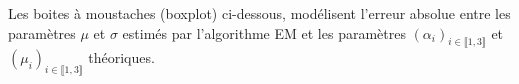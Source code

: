 \documentclass[frenchb]{report}
\newcommand{\1}{\mathbbm{1}}
\theoremstyle{definition}\newtheorem{defn}{Définition}
\theoremstyle{definition}\newtheorem{exm}{Exemple}
\theoremstyle{definition}\newtheorem{nota}{Notation}
\theoremstyle{definition}\newtheorem{rem}{Remarque}
\begin{document}
Les boites à moustaches (boxplot) ci-dessous, modélisent l'erreur absolue entre les paramètres $\mu$ et $\sigma$ estimés par l'algorithme EM et les paramètres $(\alpha_i)_{i\in\llbracket1,3\rrbracket}$ et $(\mu_i)_{i\in\llbracket1,3\rrbracket}$ théoriques.

\pagebreak

\begin{figure}[htp] 
	\centering
	\hfill%
\end{figure}
\end{document}
